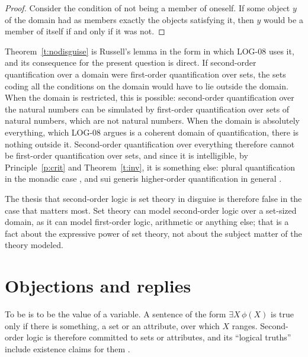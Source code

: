 \documentclass{situationist-preprint}
\begin{document}
\begin{proof}
Consider the condition of not being a member of oneself. If some object $y$ of the domain had as members exactly the objects satisfying it, then $y$ would be a member of itself if and only if it was not.
\end{proof}

Theorem~\ref{t:nodisguise} is Russell's lemma in the form in which LOG-08 uses it, and its consequence for the present question is direct. If second-order quantification over a domain were first-order quantification over sets, the sets coding all the conditions on the domain would have to lie outside the domain. When the domain is restricted, this is possible: second-order quantification over the natural numbers can be simulated by first-order quantification over sets of natural numbers, which are not natural numbers. When the domain is absolutely everything, which LOG-08 argues is a coherent domain of quantification, there is nothing outside it. Second-order quantification over everything therefore cannot be first-order quantification over sets, and since it is intelligible, by Principle~\ref{p:crit} and Theorem~\ref{t:inv}, it is something else: plural quantification in the monadic case \citep{Boolos1984}, and sui generis higher-order quantification in general \citep{Williamson2003,Wright2007}.

The thesis that second-order logic is set theory in disguise is therefore false in the case that matters most. Set theory can model second-order logic over a set-sized domain, as it can model first-order logic, arithmetic or anything else; that is a fact about the expressive power of set theory, not about the subject matter of the theory modeled.

\section{Objections and replies}\label{s:obj}

\begin{objection}
To be is to be the value of a variable. A sentence of the form $\exists X\, \phi(X)$ is true only if there is something, a set or an attribute, over which $X$ ranges. Second-order logic is therefore committed to sets or attributes, and its \enquote{logical truths} include existence claims for them \citep{Quine1970}.
\end{objection}
\end{document}
